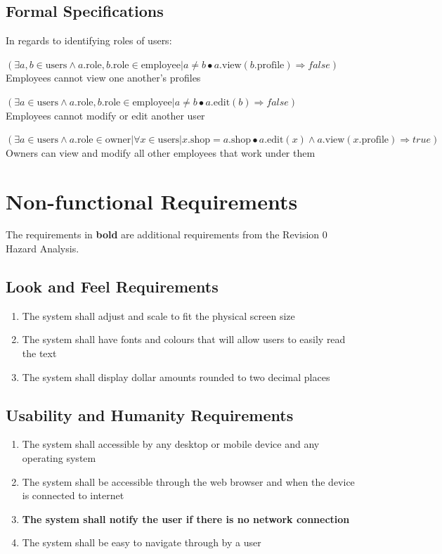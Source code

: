 \documentclass[12pt]{article}
\begin{document}
\subsection{Formal Specifications}
In regards to identifying roles of users:

$(\exists a, b \in \text{users} \wedge a.\text{role},
	b.\text{role} \in \text{employee} | a \neq b \bullet a.\text{view}(b.\text{profile}) \Rightarrow
	false)$\\
Employees cannot view one another's profiles

$(\exists a \in \text{users} \wedge a.\text{role}, b.\text{role} \in \text{employee} | a \neq b \bullet a.\text{edit}(b) \Rightarrow false)$\\
Employees cannot modify or edit another user

$(\exists a \in \text{users} \wedge a.\text{role} \in \text{owner} | \forall x \in \text{users} | x.\text{shop} = a.\text{shop} \bullet a.\text{edit}(x) \wedge a.\text{view}(x.\text{profile}) \Rightarrow true)$\\
Owners can view and modify all other employees that work under them

\section{Non-functional Requirements}
The requirements in \textbf{bold} are additional requirements from the Revision 0 Hazard Analysis.

\subsection{Look and Feel Requirements}
\begin{enumerate}[LF\arabic*.]
	\item The system shall adjust and scale to fit the physical screen size
	\item The system shall have fonts and colours that will allow users to easily read the text
	\item The system shall display dollar amounts rounded to two decimal places
\end{enumerate}

\subsection{Usability and Humanity Requirements}
\begin{enumerate}[UH\arabic*.]
	\item The system shall accessible by any desktop or mobile device and any operating system
	\item The system shall be accessible through the web browser and when the device is connected to internet
	\item \textbf{The system shall notify the user if there is no network connection}
	\item The system shall be easy to navigate through by a user
\end{enumerate}
\end{document}
